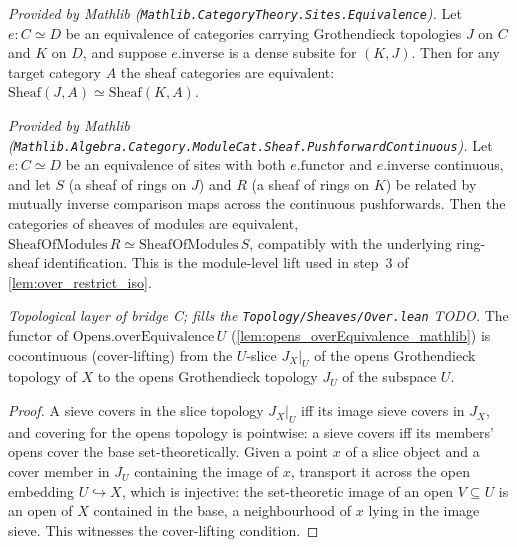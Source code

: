 \begin{lemma}
  \label{lem:equivalence_sheafCongr_mathlib}
  \mathlibok
  \textit{Provided by Mathlib (\texttt{Mathlib.CategoryTheory.Sites.Equivalence}).}
  Let \(e : C \simeq D\) be an equivalence of categories carrying Grothendieck topologies \(J\)
  on \(C\) and \(K\) on \(D\), and suppose \(e.\mathrm{inverse}\) is a dense subsite for
  \((K, J)\). Then for any target category \(A\) the sheaf categories are equivalent:
  \(\mathrm{Sheaf}(J, A) \simeq \mathrm{Sheaf}(K, A)\).
\end{lemma}

\begin{lemma}
  \label{lem:pushforwardPushforwardEquivalence_mathlib}
  \mathlibok
  \textit{Provided by Mathlib
  (\texttt{Mathlib.Algebra.Category.ModuleCat.Sheaf.PushforwardContinuous}).}
  Let \(e : C \simeq D\) be an equivalence of sites with both \(e.\mathrm{functor}\) and
  \(e.\mathrm{inverse}\) continuous, and let \(S\) (a sheaf of rings on \(J\)) and \(R\) (a sheaf
  of rings on \(K\)) be related by mutually inverse comparison maps across the continuous
  pushforwards. Then the categories of sheaves of modules are equivalent,
  \(\mathrm{SheafOfModules}\,R \simeq \mathrm{SheafOfModules}\,S\), compatibly with the
  underlying ring-sheaf identification. This is the module-level lift used in step~3 of
  \cref{lem:over_restrict_iso}.
\end{lemma}

\begin{lemma}
  \label{lem:overEquivalence_functor_isCocontinuous}
  \textit{Topological layer of bridge C; fills the \texttt{Topology/Sheaves/Over.lean} TODO.}
  The functor of \(\mathrm{Opens.overEquivalence}\,U\) (\cref{lem:opens_overEquivalence_mathlib})
  is cocontinuous (cover-lifting) from the \(U\)-slice \(J_X|_U\) of the opens Grothendieck
  topology of \(X\) to the opens Grothendieck topology \(J_U\) of the subspace \(U\).
\end{lemma}
\begin{proof}
  A sieve covers in the slice topology \(J_X|_U\) iff its image sieve covers in \(J_X\), and
  covering for the opens topology is pointwise: a sieve covers iff its members' opens cover the
  base set-theoretically. Given a point \(x\) of a slice object and a cover member in \(J_U\)
  containing the image of \(x\), transport it across the open embedding \(U \hookrightarrow X\),
  which is injective: the set-theoretic image of an open \(V \subseteq U\) is an open of \(X\)
  contained in the base, a neighbourhood of \(x\) lying in the image sieve. This witnesses the
  cover-lifting condition.
\end{proof}

